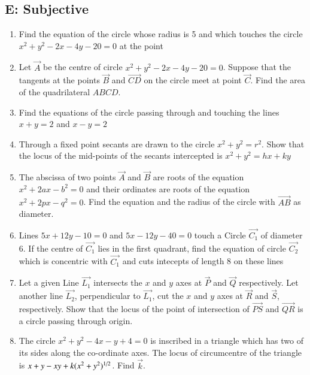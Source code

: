 \documentclass[journal,12pt,twocolumn]{IEEEtran}
\theoremstyle{remark}
\begin{document}
\subsection*{E: Subjective}
\begin{enumerate}
\item Find the equation of the circle whose radius is 5 and which touches the circle $x^2+y^2-2x-4y-20=0$ at the point 

\hfill {}
\item Let $\vec{A}$ be the centre of circle $x^2+y^2-2x-4y-20=0$. Suppose that the tangents at the points $\vec{B}$ and $\vec{CD}$  on the circle meet at point $\vec{C}$. Find the area of the quadrilateral $ABCD$.

\hfill {}
\item Find the equations of the circle passing through  and touching the lines $x+y=2$ and $x-y=2$

\hfill {}
\item Through a fixed point  secants are drawn to the circle $x^2+y^2=r^2$. Show that the locus of the mid-points of the secants intercepted is $x^2+y^2=hx+ky$

\hfill {}
\item The abscissa of two points $\vec{A}$ and $\vec{B}$ are roots of the equation $x^2+2ax-b^2=0$ and their ordinates are roots of the equation $x^2+2px-q^2=0$. Find the equation and the radius of the circle with $\vec{AB}$ as diameter.

\hfill {}
\item Lines $5x+12y-10=0$ and $5x-12y-40=0$ touch a Circle $\vec{C_1}$ of diameter 6. If the centre of $\vec{C_1}$ lies in the first quadrant, find the equation of circle $\vec{C_2}$ which is concentric with $\vec{C_1}$ and cuts intecepts of length 8 on these lines

\hfill {}
\item Let a given Line $\vec{L_1}$ intersects the $x$ and $y$ axes at $\vec{P}$ and $\vec{Q}$ respectively. Let another line $\vec{L_2}$, perpendicular to $\vec{L_1}$, cut the $x$ and $y$ axes at $\vec{R}$ and $\vec{S}$, respectively. Show that the locus of the point of intersection of $\vec{PS}$ and $\vec{QR}$ is a circle passing through origin.

\hfill {}
\item The circle $x^2+y^2-4x-y+4=0$ is inscribed in a triangle which has two of its sides along the co-ordinate axes. The locus of circumcentre of the triangle is $x+y-xy+k(x^2+y^2)\textsuperscript{1/2}$. Find $\vec{k}$.


\end{enumerate}
\end{document}
